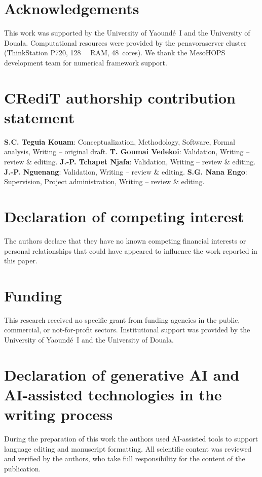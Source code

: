 \documentclass[preprint,12pt]{elsarticle}
\begin{document}
\section*{Acknowledgements}
This work was supported by the University of Yaound\'{e}~I and the University of Douala.
Computational resources were provided by the penavoraserver cluster (ThinkStation P720, \qty{128}{\giga\byte} RAM, 48~cores).
We thank the MesoHOPS development team for numerical framework support.

\section*{CRediT authorship contribution statement}
\textbf{S.C. Teguia Kouam}: Conceptualization, Methodology, Software, Formal analysis, Writing -- original draft.
\textbf{T. Goumai Vedekoi}: Validation, Writing -- review \& editing.
\textbf{J.-P. Tchapet Njafa}: Validation, Writing -- review \& editing.
\textbf{J.-P. Nguenang}: Validation, Writing -- review \& editing.
\textbf{S.G. Nana Engo}: Supervision, Project administration, Writing -- review \& editing.

\section*{Declaration of competing interest}
The authors declare that they have no known competing financial interests or personal relationships that could have appeared to influence the work reported in this paper.

\section*{Funding}
This research received no specific grant from funding agencies in the public, commercial, or not-for-profit sectors. Institutional support was provided by the University of Yaound\'{e}~I and the University of Douala.

\section*{Declaration of generative AI and AI-assisted technologies in the writing process}
During the preparation of this work the authors used AI-assisted tools to support language editing and manuscript formatting. All scientific content was reviewed and verified by the authors, who take full responsibility for the content of the publication.
\end{document}
